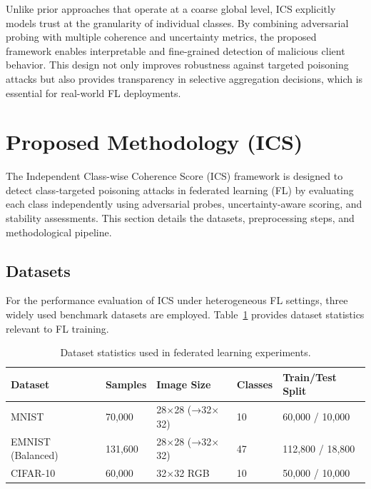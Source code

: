 \documentclass[conference]{IEEEtran}
\begin{document}
Unlike prior approaches that operate at a coarse global level, ICS explicitly models trust at the granularity of individual classes. By combining adversarial probing with multiple coherence and uncertainty metrics, the proposed framework enables interpretable and fine-grained detection of malicious client behavior. This design not only improves robustness against targeted poisoning attacks but also provides transparency in selective aggregation decisions, which is essential for real-world FL deployments.


\section{Proposed Methodology (ICS)}
\label{sec:method}

The Independent Class-wise Coherence Score (ICS) framework is designed to detect class-targeted poisoning attacks in federated learning (FL) by evaluating each class independently using adversarial probes, uncertainty-aware scoring, and stability assessments. This section details the datasets, preprocessing steps, and methodological pipeline.

\subsection{Datasets}
\label{sec:datasets}

For the performance evaluation of ICS under heterogeneous FL settings, three widely used benchmark datasets are employed. Table~\ref{tab:datasets} provides dataset statistics relevant to FL training.

\begin{table}[h]
\centering
\caption{Dataset statistics used in federated learning experiments.}
\label{tab:datasets}
\begin{tabular}{p{1.5cm} p{1.2cm} p{1.3cm} p{1.3cm} p{1.5cm}}
\toprule
\textbf{Dataset} & \textbf{Samples} & \textbf{Image Size} & \textbf{Classes} & \textbf{Train/Test Split} \\
\midrule

MNIST & 70{,}000 & 28$\times$28 (→32$\times$32) & 10 & 60{,}000 / 10{,}000 \\[4pt]

EMNIST (Balanced) & 131{,}600 & 28$\times$28 (→32$\times$32) & 47 & 112{,}800 / 18{,}800 \\[4pt]

CIFAR-10 & 60{,}000 & 32$\times$32 RGB & 10 & 50{,}000 / 10{,}000 \\

\bottomrule
\end{tabular}
\end{table}
\end{document}
